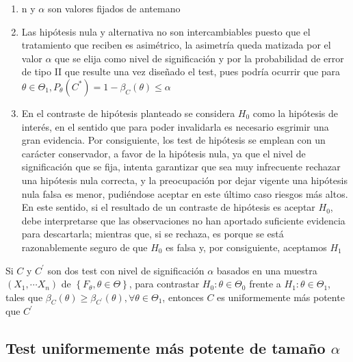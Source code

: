 \begin{observación}
\vspace{-2.5em}
\begin{enumerate}
\item n y $\alpha$ son valores fijados de antemano
\item Las hipótesis nula y alternativa no son intercambiables puesto que el tratamiento que reciben es asimétrico, la asimetría queda matizada por el valor $\alpha$ que se elija como nivel de significación y por la probabilidad de error de tipo II que resulte una vez diseñado el test, pues podría ocurrir que para $\theta \in \Theta_{1}, P_{\theta}\left(C^{*}\right)=1-\beta_{C}(\theta) \leq \alpha$
\item  En el contraste de hipótesis planteado se considera $H_{0}$ como la hipótesis de interés, en el sentido que para poder invalidarla es necesario esgrimir una gran evidencia. Por consiguiente, los test de hipótesis se emplean con un carácter conservador, a favor de la hipótesis nula, ya que el nivel de significación que se fija, intenta garantizar que sea muy infrecuente rechazar una hipótesis nula correcta, y la preocupación por dejar vigente una hipótesis nula falsa es menor, pudiéndose aceptar en este último caso riesgos más altos. En este sentido, si el resultado de un contraste de hipótesis es aceptar $H_{0}$, debe interpretarse que las observaciones no han aportado suficiente evidencia para descartarla; mientras que, si se rechaza, es porque se está razonablemente seguro de que $H_{0}$ es falsa y, por consiguiente, aceptamos $H_{1}$
\end{enumerate}
\end{observación}

\begin{proposición} 
Si $C$ y $C^{\prime}$ son dos test con nivel de significación $\alpha$ basados en una muestra $\left(X_{1}, \cdots X_{n}\right)$ de $\left\{F_{\theta}, \theta \in \Theta\right\}$, para contrastar $H_{0}: \theta \in \Theta_{0}$ frente a $H_{1}: \theta \in \Theta_{1}$, tales que $\beta_{C}(\theta) \geq \beta_{C^{\prime}}(\theta), \forall \theta \in \Theta_{1}$, entonces $C$ es uniformemente más potente que $C^{\prime}$    
\end{proposición}



\subsection{Test uniformemente más potente de tamaño $\alpha$}


